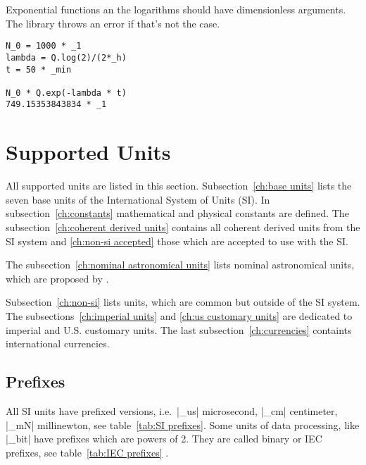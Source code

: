 \documentclass{ltxdoc}
\begin{document}
Exponential functions an the logarithms should have dimensionless arguments. The library throws an error if that's not the case.
%
\begin{lstlisting}[caption=Exponential function and logarithm,label=lst:exp and log]
N_0 = 1000 * _1
lambda = Q.log(2)/(2*_h)
t = 50 * _min

N_0 * Q.exp(-lambda * t)
749.15353843834 * _1
\end{lstlisting}










\newpage
\section{Supported Units}
\label{ch:Supported Units}

All supported units are listed in this section. Subsection~\ref{ch:base units} lists the seven base units of the International System of Units (SI). In subsection~\ref{ch:constants}  mathematical and physical constants are defined. The subsection~\ref{ch:coherent derived units} contains all coherent derived units from the SI system and \ref{ch:non-si accepted} those which are accepted to use with the SI.

The subsection~\ref{ch:nominal astronomical units} lists nominal astronomical units, which are proposed by \cite{iau16}.

Subsection~\ref{ch:non-si} lists units, which are common but outside of the SI system. The subsections~\ref{ch:imperial units} and \ref{ch:us customary units} are dedicated to imperial and U.S. customary units. The last subsection~\ref{ch:currencies} containts international currencies.


\renewcommand{\arraystretch}{1.5}

\subsection{Prefixes}

All SI units have prefixed versions, i.e.\ |_us| microsecond, |_cm| centimeter, |_mN| millinewton, see table~\ref{tab:SI prefixes}. Some units of data processing, like |_bit| have prefixes which are powers of 2. They are called binary or IEC prefixes, see table~\ref{tab:IEC prefixes} \cite[121]{bipm06}.
\end{document}
